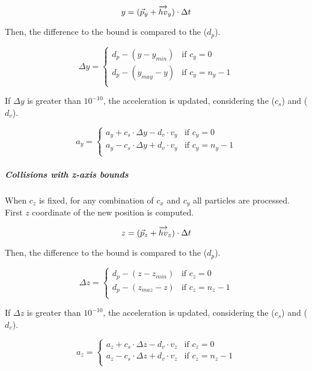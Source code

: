 \[
y = (\vec{p}_y + \overrightarrow{hv}_y) \cdot \Delta t \\
\]

Then, the difference to the bound is compared to the 
($d_p$).

\[
\Delta y = 
\begin{cases}
d_p - (y - y_{min}) & \text{if } c_y = 0\\
d_p - (y_{may} - y) & \text{if } c_y = n_y -1\\
\end{cases}
\]

If $\Delta y$ is greater than $10^{-10}$, the acceleration is updated,
considering the  ($c_s$) and 
($d_v$).

\[
a_y = 
\begin{cases}
  a_y + c_s \cdot \Delta y - d_v \cdot v_y & \text{if  } c_y = 0\\
  a_y - c_s \cdot \Delta y + d_v \cdot v_y & \text{if  } c_y = n_y-1\\
\end{cases}
\]

\subparagraph{Collisions with z-axis bounds}

When $c_z$ is fixed, for any combination of $c_x$ and $c_y$ all particles are
processed. First $z$ coordinate of the new position is computed.

\[
z = (\vec{p}_z + \overrightarrow{hv}_z) \cdot \Delta t \\
\]

Then, the difference to the bound is compared to the 
($d_p$).

\[
\Delta z = 
\begin{cases}
d_p - (z - z_{min}) & \text{if } c_z = 0\\
d_p - (z_{maz} - z) & \text{if } c_z = n_z -1\\
\end{cases}
\]

If $\Delta z$ is greater than $10^{-10}$, the acceleration is updated,
considering the  ($c_s$) and 
($d_v$).

\[
a_z = 
\begin{cases}
  a_z + c_s \cdot \Delta z - d_v \cdot v_z & \text{if  } c_z = 0\\
  a_z - c_s \cdot \Delta z + d_v \cdot v_z & \text{if  } c_z = n_z-1\\
\end{cases}
\]


